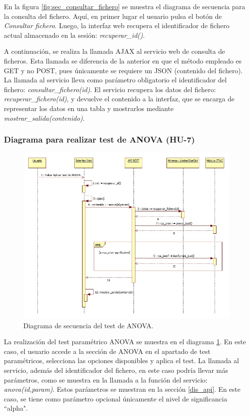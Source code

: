 En la figura \ref{fig:sec_consultar_fichero} se muestra el diagrama de secuencia para la consulta del fichero. Aquí, en primer lugar el usuario pulsa el botón de \textit{Consultar fichero}. Luego, la interfaz web recupera el identificador de fichero actual almacenado en la sesión: \textit{recuperar\_id()}.

A continuación, se realiza la llamada AJAX al servicio web de consulta de ficheros. Esta llamada se diferencia de la anterior en que el método empleado es GET y no POST, pues únicamente se requiere un JSON (contenido del fichero). La llamada al servicio lleva como parámetro obligatorio el identificador del fichero: \textit{consultar\_fichero(id)}. El servicio recupera los datos del fichero: \textit{recuperar\_fichero(id)}, y devuelve el contenido a la interfaz, que se encarga de representar los datos en una tabla y mostrarlos mediante \textit{mostrar\_salida(contenido)}.

\subsubsection{Diagrama para realizar test de ANOVA (HU-7)}

\begin{figure}[H]
\centering
\includegraphics[scale=0.5]{figuras/sec_anova.jpg}
\caption{Diagrama de secuencia del test de ANOVA.}
\label{fig:sec_anova}
\end{figure}

La realización del test paramétrico ANOVA se muestra en el diagrama \ref{fig:sec_anova}. En este caso, el usuario accede a la sección de ANOVA en el apartado de test paramétricos, selecciona las opciones disponibles y aplica el test. La llamada al servicio, además del identificador del fichero, en este caso podría llevar más parámetros, como se muestra en la llamada a la función del servicio: \textit{anova(id,param)}. Estos parámetros se muestran en la sección \ref{dis_api}. En este caso, se tiene como parámetro opcional únicamente el nivel de significancia ``alpha".

